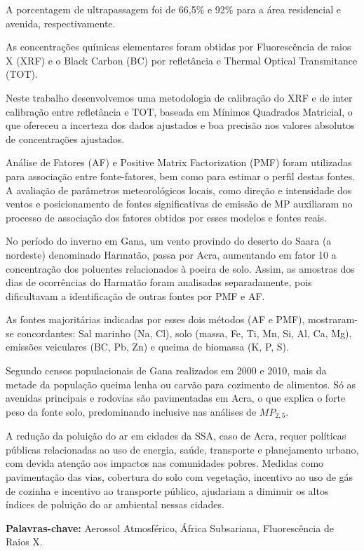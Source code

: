 A porcentagem de ultrapassagem foi de 66,5\% e 92\% para 
a área residencial e avenida, respectivamente. 

As concentrações químicas elementares foram obtidas por 
Fluorescência de raios X (XRF) e o Black Carbon (BC) por 
refletância e Thermal Optical Transmitance (TOT). 

Neste trabalho desenvolvemos uma metodologia de calibração do XRF 
e de inter calibração entre refletância e TOT, 
baseada em Mínimos Quadrados Matricial, o que ofereceu a 
incerteza dos dados ajustados e boa precisão nos valores 
absolutos de concentrações ajustados.

Análise de Fatores (AF) e Positive Matrix Factorization (PMF) foram utilizadas
para associação entre fonte-fatores, bem como para estimar o perfil destas fontes. 
A avaliação de parâmetros meteorológicos locais, como direção e intensidade 
dos ventos e posicionamento de fontes significativas de emissão de MP 
auxiliaram no processo de associação dos fatores obtidos por esses modelos e 
fontes reais. 

No período do inverno em Gana, um vento  
provindo do deserto do Saara (a nordeste) denominado Harmatão, 
passa por Acra, aumentando em fator 10 a concentração dos poluentes 
relacionados à poeira de solo. Assim, as amostras dos dias de ocorrências 
do Harmatão foram analisadas separadamente, pois dificultavam a 
identificação de outras fontes por PMF e AF.

As fontes majoritárias indicadas por esses dois métodos (AF e PMF), 
mostraram-se concordantes: Sal marinho (Na, Cl), solo (massa, Fe, Ti, Mn, 
Si, Al, Ca, Mg), emissões veiculares (BC, Pb, Zn) e queima de 
biomassa (K, P, S). 

Segundo censos populacionais de Gana realizados em 2000 e 2010, 
mais da metade da população queima lenha ou carvão para cozimento 
de alimentos. 
Só as avenidas principais e rodovias são pavimentadas em Acra, 
o que explica o forte peso da fonte solo, predominando 
inclusive nas análises de $MP_{2,5}$.

A redução da poluição do ar em cidades da SSA, caso de Acra, 
requer políticas públicas relacionadas ao uso de energia, saúde, 
transporte e planejamento urbano, com devida atenção 
aos impactos nas comunidades pobres. 
Medidas como pavimentação das vias, cobertura do solo com vegetação, 
incentivo ao uso de gás de cozinha e incentivo ao transporte público, 
ajudariam a diminuir os altos índices de poluição do ar ambiental nessas cidades.



\par
\vspace{1em}
\noindent\textbf{Palavras-chave:}  Aerossol Atmosférico, África Subsariana, Fluorescência de Raios X.
\newpage
